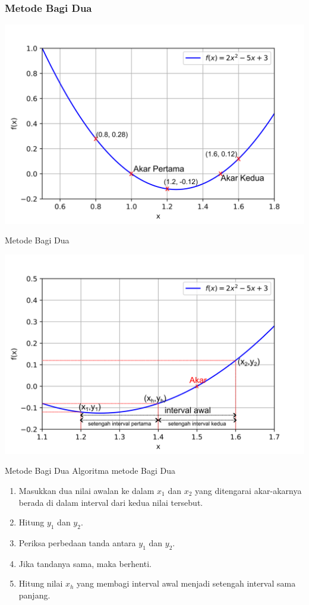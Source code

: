 \documentclass[pdflatex,compress]{beamer}
\begin{document}
\begin{frame}
	\frametitle{Metode Bagi Dua}
	\begin{center}
		\includegraphics[width=\linewidth]{img/01}
	\end{center}
\end{frame}

\begin{frame}{Metode Bagi Dua}
	\begin{center}
		\includegraphics[width=\linewidth]{img/02}
	\end{center}
\end{frame}

\begin{frame}{Metode Bagi Dua}
	Algoritma metode Bagi Dua
	\begin{enumerate}
		\item Masukkan dua nilai awalan ke dalam $ x_1 $ dan $ x_2 $ yang ditengarai akar-akarnya berada di dalam interval dari kedua nilai tersebut.
		\item Hitung $ y_1 $ dan $ y_2 $.
		\item Periksa perbedaan tanda antara $ y_1 $ dan $ y_2 $.
		\item Jika tandanya sama, maka berhenti.
		\item Hitung nilai $ x_h $ yang membagi interval awal menjadi setengah interval sama panjang.
	\end{enumerate}
\end{frame}
\end{document}
